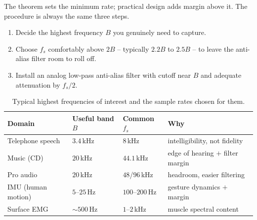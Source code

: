 The theorem sets the minimum rate; practical design adds margin above it. The
procedure is always the same three steps.

\begin{enumerate}
\item Decide the highest frequency $B$ you genuinely need to capture.
\item Choose $f_s$ comfortably above $2B$ -- typically $2.2B$ to $2.5B$ -- to leave the
      anti-alias filter room to roll off.
\item Install an analog low-pass anti-alias filter with cutoff near $B$ and adequate
      attenuation by $f_s/2$.
\end{enumerate}

\begin{table}[H]
\centering
\caption{Typical highest frequencies of interest and the sample rates chosen for them.}
\label{ch18:tab-rates}
\begin{tabular}{@{}llll@{}}
\toprule
Domain & Useful band $B$ & Common $f_s$ & Why \\
\midrule
Telephone speech   & $3.4$\,kHz     & $8$\,kHz         & intelligibility, not fidelity \\
Music (CD)         & $20$\,kHz      & $44.1$\,kHz      & edge of hearing $+$ filter margin \\
Pro audio          & $20$\,kHz      & $48$/$96$\,kHz   & headroom, easier filtering \\
IMU (human motion) & $5$--$25$\,Hz  & $100$--$200$\,Hz & gesture dynamics $+$ margin \\
Surface EMG        & $\sim 500$\,Hz & $1$--$2$\,kHz    & muscle spectral content \\
\bottomrule
\end{tabular}
\end{table}

